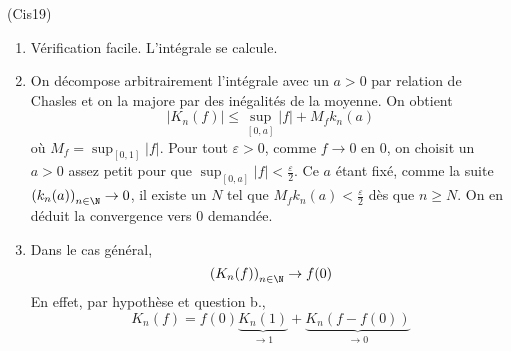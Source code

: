 \begin{tiny}(Cis19)\end{tiny}
\begin{enumerate}
 \item Vérification facile. L'intégrale se calcule.
 \item On décompose arbitrairement l'intégrale avec un $a>0$ par relation de Chasles et on la majore par des inégalités de la moyenne. On obtient
\begin{displaymath}
 |K_n(f)|\leq \sup_{[0,a]}|f| + M_fk_n(a)
\end{displaymath}
où $M_f= \sup_{[0,1]}|f|$.\newline
Pour tout $\varepsilon >0$, comme $f\rightarrow 0$ en $0$, on choisit un $a>0$ assez petit pour que $\sup_{[0,a]}|f|<\frac{\varepsilon}{2}$. Ce $a$ étant fixé, comme la suite $\left( k_n(a)\right) _{n\in \N}\rightarrow 0$, il existe un $N$ tel que $M_fk_n(a)<\frac{\varepsilon}{2}$ dès que $n\geq N$. On en déduit la convergence vers $0$ demandée.
\item Dans le cas général,
\begin{displaymath}
 \left( K_n(f)\right) _{n\in \N} \rightarrow f(0)
\end{displaymath}
En effet, par hypothèse et question b.,
\begin{displaymath}
 K_n(f) = f(0)\underset{\rightarrow 1}{\underbrace{K_n(1)}} 
+ \underset{\rightarrow 0}{\underbrace{K_n(f-f(0))}}
\end{displaymath}

\end{enumerate}
